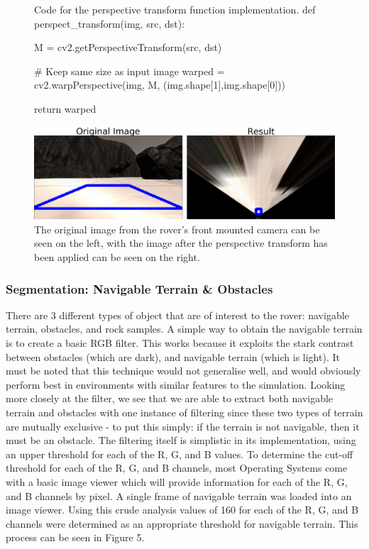 \documentclass[a4paper]{article}
\begin{document}
\begin{figure}[h]\scriptsize
\begin{sexylisting}{Code for the perspective transform function implementation.}
def perspect_transform(img, src, dst):
           
    M = cv2.getPerspectiveTransform(src, dst)
    
    # Keep same size as input image
    warped = cv2.warpPerspective(img, M, (img.shape[1],img.shape[0]))
    
    return warped
\end{sexylisting}
\end{figure}

\begin{figure}[H]
	\centering
	\includegraphics[scale=0.3]{image4}
	\caption{The original image from the rover's front mounted camera can be seen on the left, with the image after the perspective transform has been applied can be seen on the right.}
\end{figure}

\subsubsection{Segmentation: Navigable Terrain \& Obstacles}
There are 3 different types of object that are of interest to the rover: navigable terrain, obstacles, and rock samples. A simple way to obtain the navigable terrain is to create a basic RGB filter. This works because it exploits the stark contrast between obstacles (which are dark), and navigable terrain (which is light). It must be noted that this technique would not generalise well, and would obviously perform best in environments with similar features to the simulation. Looking more closely at the filter, we see that we are able to extract both navigable terrain and obstacles with one instance of filtering since these two types of terrain are mutually exclusive - to put this simply: if the terrain is not navigable, then it must be an obstacle. The filtering itself is simplistic in its implementation, using an upper threshold for each of the R, G, and B values. To determine the cut-off threshold for each of the R, G, and B channels, most Operating Systems come with a basic image viewer which will provide information for each of the R, G, and B channels by pixel. A single frame of navigable terrain was loaded into an image viewer. Using this crude analysis values of 160 for each of the R, G, and B channels were determined as an appropriate threshold for navigable terrain. This process can be seen in Figure 5.
\end{document}
